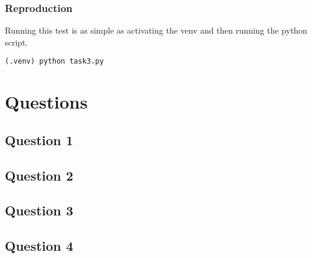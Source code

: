 \documentclass[11pt]{article}
\begin{document}
\subsubsection*{Reproduction}

Running this test is as simple as activating the venv and then running the python script.

\verb|(.venv) python task3.py|

\section*{Questions}
\subsection*{Question 1}
\subsection*{Question 2}
\subsection*{Question 3}
\subsection*{Question 4}
\end{document}
